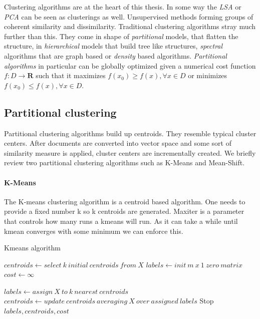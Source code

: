   Clustering algorithms are at the heart of this thesis. In some way the \emph{LSA} or \emph{PCA} can be seen as clusterings as well. Unsupervised methods forming groups of coherent similarity and dissimilarity. Traditional clustering algorithms stray much further than this. They come in shape of \emph{partitional} models, that flatten the structure, in \emph{hierarchical} models that build tree like structures, \emph{spectral} algorithms that are graph based or \emph{density} based algorithms. \emph{Partitional algorithms} in particular can be globally optimized given a numerical cost function $f:D \to \mathbf{R}$ such that it maximizes $f(x_0) \geq f(x), \forall x \in D$  or minimizes $f(x_0) \leq f(x), \forall x \in D$.

  \subsection{Partitional clustering}
    Partitional clustering algorithms build up centroids. They resemble typical cluster centers. After documents are converted into vector space and some sort of similarity measure is applied, cluster centers are incrementally created. We briefly review two partitional clustering algorithms such as K-Means and Mean-Shift.

    \paragraph{K-Means}
    The K-means clustering algorithm is a centroid based algorithm. One needs to provide a fixed number k so k centroids are generated. Maxiter is a parameter that controls how many runs a kmeans will run. As it can take a while until kmean converges with some minimum we can enforce this.

    \begin{algorithm}[H]
    \begin{algorithmic}[1]
      \caption{Kmeans algorithm}\label{kmeans}
        \State $centroids \gets select\:k\:initial\:centroids\:from\:X$
        \State $labels \gets init\:m\:x\:1\:zero\:matrix$
        \State $cost \gets \infty$

          \State $labels \gets assign\:X\:to\:k\:nearest\:centroids$
          \State $centroids \gets update\:centroids\:averaging\:X\:over\:assigned\:labels$
            \State Stop
          \EndIf
        \EndFor
        \State \Return $labels, centroids, cost$
      \EndFunction
    \end{algorithmic}
    \end{algorithm}

